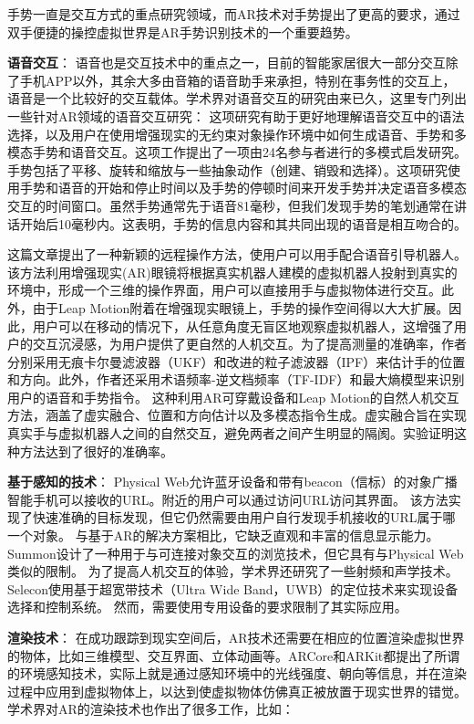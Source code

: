 手势一直是交互方式的重点研究领域，而AR技术对手势提出了更高的要求，通过双手便捷的操控虚拟世界是AR手势识别技术的一个重要趋势。

\textbf{语音交互}：
语音也是交互技术中的重点之一，目前的智能家居很大一部分交互除了手机APP以外，其余大多由音箱的语音助手来承担，特别在事务性的交互上，语音是一个比较好的交互载体。学术界对语音交互的研究由来已久，这里专门列出一些针对AR领域的语音交互研究：
这项研究\cite{WilOrt20}有助于更好地理解语音交互中的语法选择，以及用户在使用增强现实的无约束对象操作环境中如何生成语音、手势和多模态手势和语音交互。这项工作提出了一项由24名参与者进行的多模式启发研究。手势包括了平移、旋转和缩放与一些抽象动作（创建、销毁和选择）。这项研究使用手势和语音的开始和停止时间以及手势的停顿时间来开发手势并决定语音多模态交互的时间窗口。虽然手势通常先于语音81毫秒，但我们发现手势的笔划通常在讲话开始后10毫秒内。这表明，手势的信息内容和其共同出现的语音是相互吻合的。

这篇文章\cite{DuZhaLi19}提出了一种新颖的远程操作方法，使用户可以用手配合语音引导机器人。
该方法利用增强现实(AR)眼镜将根据真实机器人建模的虚拟机器人投射到真实的环境中，形成一个三维的操作界面，用户可以直接用手与虚拟物体进行交互。此外，由于Leap Motion附着在增强现实眼镜上，手势的操作空间得以大大扩展。因此，用户可以在移动的情况下，从任意角度无盲区地观察虚拟机器人，这增强了用户的交互沉浸感，为用户提供了更自然的人机交互。为了提高测量的准确率，作者分别采用无痕卡尔曼滤波器（UKF）和改进的粒子滤波器（IPF）来估计手的位置和方向。此外，作者还采用术语频率-逆文档频率（TF-IDF）和最大熵模型来识别用户的语音和手势指令。
这种利用AR可穿戴设备和Leap Motion的自然人机交互方法，涵盖了虚实融合、位置和方向估计以及多模态指令生成。虚实融合旨在实现真实手与虚拟机器人之间的自然交互，避免两者之间产生明显的隔阂。实验证明这种方法达到了很好的准确率。


\textbf{基于感知的技术}：
Physical Web\cite{jenson2014physical}允许蓝牙设备和带有beacon（信标）的对象广播智能手机可以接收的URL。附近的用户可以通过访问URL访问其界面。
该方法实现了快速准确的目标发现，但它仍然需要由用户自行发现手机接收的URL属于哪一个对象。
与基于AR的解决方案相比，它缺乏直观和丰富的信息显示能力。
Summon\cite{zachariah2020browsing}设计了一种用于与可连接对象交互的浏览技术，但它具有与Physical Web类似的限制。
为了提高人机交互的体验，学术界还研究了一些射频和声学技术\cite{alanwar2017selecon,pu2013whole,mao2016cat}。
Selecon\cite{alanwar2017selecon}使用基于超宽带技术（Ultra Wide Band，UWB）的定位技术来实现设备选择和控制系统。
然而，需要使用专用设备的要求限制了其实际应用。

\textbf{渲染技术}：
在成功跟踪到现实空间后，AR技术还需要在相应的位置渲染虚拟世界的物体，比如三维模型、交互界面、立体动画等。ARCore和ARKit都提出了所谓的环境感知技术，实际上就是通过感知环境中的光线强度、朝向等信息，并在渲染过程中应用到虚拟物体上，以达到使虚拟物体仿佛真正被放置于现实世界的错觉。学术界对AR的渲染技术也作出了很多工作，比如：

